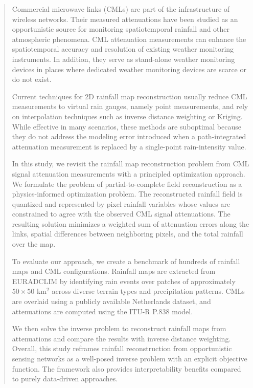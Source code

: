 \documentclass[a4paper,fleqn]{cas-sc}
\begin{document}
\begin{abstract}
  Commercial microwave links (CMLs) are part of the infrastructure of wireless networks. Their measured attenuations have been studied as an opportunistic source for monitoring spatiotemporal rainfall and other atmospheric phenomena. CML attenuation measurements can enhance the spatiotemporal accuracy and resolution of existing weather monitoring instruments. In addition, they serve as stand-alone weather monitoring devices in places where dedicated weather monitoring devices are scarce or do not exist.

  Current techniques for 2D rainfall map reconstruction usually reduce CML measurements to virtual rain gauges, namely point measurements, and rely on interpolation techniques such as inverse distance weighting or Kriging. While effective in many scenarios, these methods are suboptimal because they do not address the modeling error introduced when a path-integrated attenuation measurement is replaced by a single-point rain-intensity value.

  In this study, we revisit the rainfall map reconstruction problem from CML signal attenuation measurements with a principled optimization approach. We formulate the problem of partial-to-complete field reconstruction as a physics-informed optimization problem. The reconstructed rainfall field is quantized and represented by pixel rainfall variables whose values are constrained to agree with the observed CML signal attenuations. The resulting solution minimizes a weighted sum of attenuation errors along the links, spatial differences between neighboring pixels, and the total rainfall over the map.

  To evaluate our approach, we create a benchmark of hundreds of rainfall maps and CML configurations. Rainfall maps are extracted from EURADCLIM by identifying rain events over patches of approximately $50 \times 50$ km$^2$ across diverse terrain types and precipitation patterns. CMLs are overlaid using a publicly available Netherlands dataset, and attenuations are computed using the ITU-R P.838 model.

  We then solve the inverse problem to reconstruct rainfall maps from attenuations and compare the results with inverse distance weighting. Overall, this study reframes rainfall reconstruction from opportunistic sensing networks as a well-posed inverse problem with an explicit objective function. The framework also provides interpretability benefits compared to purely data-driven approaches.
\end{abstract}
\end{document}
